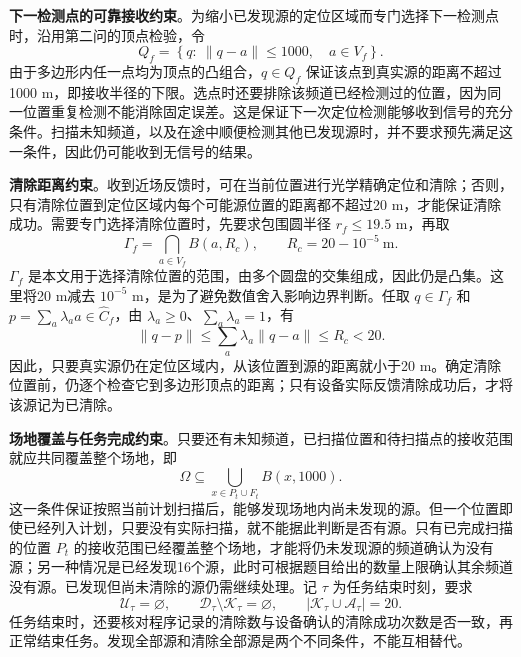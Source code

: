 \textbf{下一检测点的可靠接收约束}。为缩小已发现源的定位区域而专门选择下一检测点时，沿用第二问的顶点检验，令
\begin{equation}\label{eq:q3-reception}
Q_f=\left\{q:\ \|q-a\|\le1000,\quad a\in V_f\right\}.
\end{equation}
由于多边形内任一点均为顶点的凸组合，$q\in Q_f$ 保证该点到真实源的距离不超过1000 m，即接收半径的下限。选点时还要排除该频道已经检测过的位置，因为同一位置重复检测不能消除固定误差。这是保证下一次定位检测能够收到信号的充分条件。扫描未知频道，以及在途中顺便检测其他已发现源时，并不要求预先满足这一条件，因此仍可能收到无信号的结果。

\textbf{清除距离约束}。收到近场反馈时，可在当前位置进行光学精确定位和清除；否则，只有清除位置到定位区域内每个可能源位置的距离都不超过20 m，才能保证清除成功。需要专门选择清除位置时，先要求包围圆半径 $r_f\le19.5$ m，再取
\begin{equation}\label{eq:q3-11}
\Gamma_f=\bigcap_{a\in V_f}B(a,R_c),\qquad R_c=20-10^{-5}\ \text{m}.
\end{equation}
$\Gamma_f$ 是本文用于选择清除位置的范围，由多个圆盘的交集组成，因此仍是凸集。这里将20 m减去 $10^{-5}$ m，是为了避免数值舍入影响边界判断。任取 $q\in\Gamma_f$ 和 $p=\sum_a\lambda_a a\in\widehat C_f$，由 $\lambda_a\ge0$、$\sum_a\lambda_a=1$，有
\[
\|q-p\|\le\sum_a\lambda_a\|q-a\|\le R_c<20.
\]
因此，只要真实源仍在定位区域内，从该位置到源的距离就小于20 m。确定清除位置前，仍逐个检查它到多边形顶点的距离；只有设备实际反馈清除成功后，才将该源记为已清除。

\textbf{场地覆盖与任务完成约束}。只要还有未知频道，已扫描位置和待扫描点的接收范围就应共同覆盖整个场地，即
\begin{equation}\label{eq:q3-cover-invariant}
\Omega\subseteq\bigcup_{x\in P_t\cup F_t}B(x,1000).
\end{equation}
这一条件保证按照当前计划扫描后，能够发现场地内尚未发现的源。但一个位置即使已经列入计划，只要没有实际扫描，就不能据此判断是否有源。只有已完成扫描的位置 $P_t$ 的接收范围已经覆盖整个场地，才能将仍未发现源的频道确认为没有源；另一种情况是已经发现16个源，此时可根据题目给出的数量上限确认其余频道没有源。已发现但尚未清除的源仍需继续处理。记 $\tau$ 为任务结束时刻，要求
\begin{equation}\label{eq:q3-finish}
\mathcal U_\tau=\varnothing,\qquad
\mathcal D_\tau\setminus\mathcal K_\tau=\varnothing,\qquad
|\mathcal K_\tau\cup\mathcal A_\tau|=20.
\end{equation}
任务结束时，还要核对程序记录的清除数与设备确认的清除成功次数是否一致，再正常结束任务。发现全部源和清除全部源是两个不同条件，不能互相替代。

